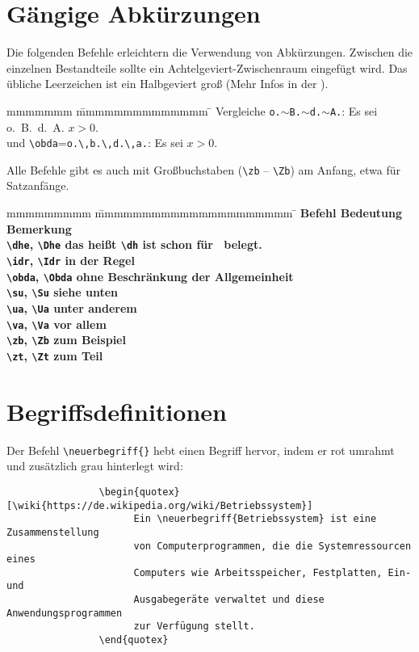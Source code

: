 		\newpage
		\section{Gängige Abkürzungen}
			Die folgenden Befehle erleichtern die Verwendung von Abkürzungen. Zwischen die einzelnen Bestandteile sollte ein Achtelgeviert-Zwischenraum eingefügt wird. Das übliche Leerzeichen ist \idr ein Halbgeviert groß (Mehr Infos in der ).
			\begin{tabbing}
				mmmmmmm			\= mmmmmmmmmmmmmm						\= \kill
				Vergleiche		\>\texttt{o.$\sim$B.$\sim$d.$\sim$A.}:	\> Es sei o.~B.~d.~A. $x>0$.\\
				und				\>\verb|\obda|=\verb|o.\,b.\,d.\,a.|:	\> Es sei \obda $x>0$.
			\end{tabbing}
			Alle Befehle gibt es auch mit Großbuchstaben (\verb|\zb| -- \verb|\Zb|) am Anfang, etwa für Satzanfänge.
			\begin{tabbing}
				mmmmmmmmm						\= mmmmmmmmmmmmmmmmmmmmm		\=\kill
				\bf Befehl						\> \bf Bedeutung 				\> \bf Bemerkung\\
				\verb|\dhe|, \verb|\Dhe|		\> das heißt 					\> \verb|\dh| ist schon für \dh\ belegt.	\\
				\verb|\idr|, \verb|\Idr|		\> in der Regel															\\
				\verb|\obda|, \verb|\Obda|		\> ohne Beschränkung der Allgemeinheit 									\\
				\verb|\su|, \verb|\Su|			\> siehe unten															\\
				\verb|\ua|, \verb|\Ua|			\> unter anderem														\\
				\verb|\va|, \verb|\Va|			\> vor allem															\\
				\verb|\zb|, \verb|\Zb|			\> zum Beispiel															\\
				\verb|\zt|,	\verb|\Zt|			\> zum Teil				
			\end{tabbing}
		\section{Begriffsdefinitionen}
			\label{begriffsdefinitionen}
			Der Befehl \verb|\neuerbegriff{}| hebt einen Begriff hervor, indem er rot umrahmt und zusätzlich grau hinterlegt wird:
			\begin{verbatim}
				\begin{quotex}[\wiki{https://de.wikipedia.org/wiki/Betriebssystem}]
				      Ein \neuerbegriff{Betriebssystem} ist eine Zusammenstellung 
				      von Computerprogrammen, die die Systemressourcen eines 
				      Computers wie Arbeitsspeicher, Festplatten, Ein- und 
				      Ausgabegeräte verwaltet und diese Anwendungsprogrammen 
				      zur Verfügung stellt. 
				\end{quotex}
			\end{verbatim}
			
